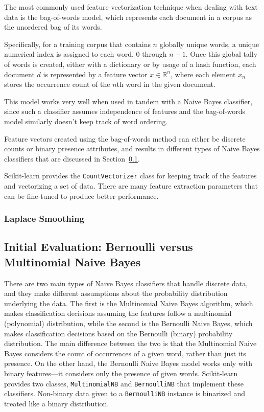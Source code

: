 \documentclass[letter,12pt]{article}
\begin{document}
The most commonly used feature vectorization technique when dealing with text
data is the bag-of-words model, which represents each document in a corpus as
the unordered bag of its words.

Specifically, for a training corpus that contains
$n$ globally unique words, a unique numerical index is assigned to each word, 0
through $n - 1$. Once this global tally of words is created, either with a
dictionary or by usage of a hash function, each document $d$ is represented by
a feature vector $x \in \mathbb{R}^n$, where each element $x_n$ stores the
occurrence count of the $n$th word in the given document.

This model works very well when used in tandem with a Naive Bayes classifier,
since such a classifier assumes independence of features and the bag-of-words
model similarly doesn't keep track of word ordering.

Feature vectors created using the bag-of-words method can either be discrete
counts or binary presence attributes, and results in different types of Naive
Bayes classifiers that are discussed in Section~\ref{sub:initial_evaluation}.

Scikit-learn provides the \texttt{CountVectorizer} class for keeping track of
the features and vectorizing a set of data. There are many feature extraction
parameters that can be fine-tuned to produce better performance.

\subsubsection{Laplace Smoothing}
\label{ssub:laplace_smoothing}

\subsection{Initial Evaluation: Bernoulli versus Multinomial Naive Bayes}
\label{sub:initial_evaluation}

There are two main types of Naive Bayes classifiers that handle discrete data,
and they make different assumptions about the probability distribution
underlying the data. The first is the Multinomial Naive Bayes algorithm, which
makes classification decisions assuming the features follow a multinomial
(polynomial) distribution, while the second is the Bernoulli Naive Bayes, which
makes classification decisions based on the Bernoulli (binary) probability
distribution. The main difference between the two is that the Multinomial Naive
Bayes considers the count of occurrences of a given word, rather than just its
presence. On the other hand, the Bernoulli Naive Bayes model works only with
binary features---it considers only the presence of given words. Scikit-learn
provides two classes, \texttt{MultinomialNB} and \texttt{BernoulliNB} that
implement these classifiers. Non-binary data given to a \texttt{BernoulliNB}
instance is binarized and treated like a binary distribution.
\end{document}
